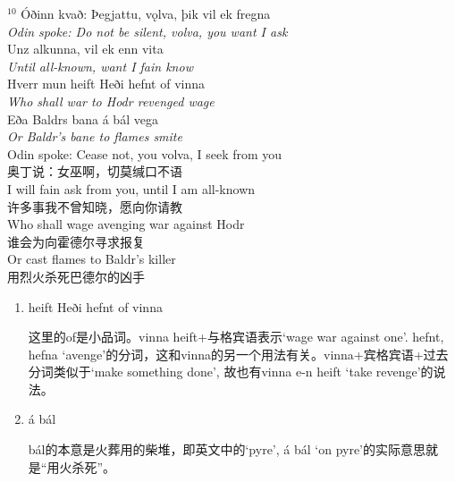 \begin{paracol}{2}
  \noindent
  $^{10}$ Óðinn kvað: Þegjattu, vǫlva, þik vil ek fregna\\
  \textit{Odin spoke: Do not be silent, volva, you want I ask}\\
  Unz alkunna, vil ek enn vita\\
  \textit{Until all-known, want I fain know}\\
  Hverr mun heift Heði hefnt of vinna\\
  \textit{Who shall war to Hodr revenged wage}\\
  Eða Baldrs bana á bál vega\\
  \textit{Or Baldr's bane to flames smite}\\
  \switchcolumn
  \noindent
  Odin spoke: Cease not, you volva, I seek from you\\
  奥丁说：女巫啊，切莫缄口不语\\
  I will fain ask from you, until I am all-known\\
  许多事我不曾知晓，愿向你请教\\
  Who shall wage avenging war against Hodr\\
  谁会为向霍德尔寻求报复\\
  Or cast flames to Baldr's killer\\
  用烈火杀死巴德尔的凶手

\end{paracol}
\begin{grammar*}{}
  \begin{enumerate}[leftmargin=*]
    \item heift Heði hefnt of vinna

          这里的of是小品词。vinna heift+与格宾语表示`wage war against one'. hefnt, hefna `avenge'的分词，这和vinna的另一个用法有关。vinna+宾格宾语+过去分词类似于`make something done', 故也有vinna e-n heift `take revenge'的说法。
    \item á bál

          bál的本意是火葬用的柴堆，即英文中的`pyre', á bál `on pyre'的实际意思就是“用火杀死”。
  \end{enumerate}
\end{grammar*}

